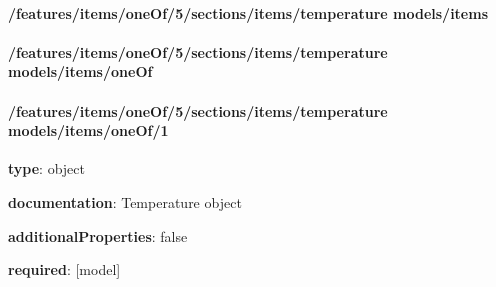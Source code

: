 \begin{itemized}
\paragraph{/features/items/oneOf/5/sections/items/temperature models/items} \begin{itemized}
\end{itemized}\end{itemized}\paragraph{/features/items/oneOf/5/sections/items/temperature models/items/oneOf} \begin{itemized}
\end{itemized}\paragraph{/features/items/oneOf/5/sections/items/temperature models/items/oneOf/1} \begin{itemized}
\item {\bf type}: object
\item {\bf documentation}: Temperature object
\item {\bf additionalProperties}: false
\item {\bf required}: [model]\end{itemized}
